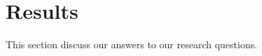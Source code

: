 \section{Results} \label{results}

This section discuss our answers to our research questions.





%
